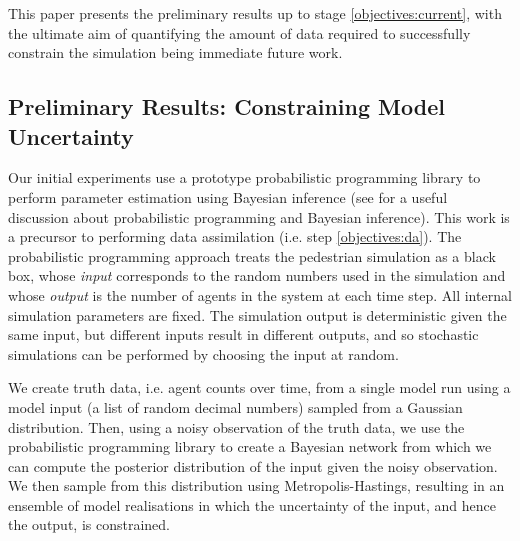 \documentclass[runningheads]{llncs}
\begin{document}
This paper presents the preliminary results up to stage \ref{objectives:current}, with the ultimate aim of quantifying the amount of data required to successfully constrain the simulation being immediate future work. 


\subsection{Preliminary Results: Constraining Model Uncertainty}

Our initial experiments use a prototype probabilistic programming library to perform parameter estimation using Bayesian inference (see \cite{ghahramani_probabilistic_2015} for a useful discussion about probabilistic programming and Bayesian inference). This work is a precursor to performing data assimilation (i.e. step \ref{objectives:da}). The probabilistic programming approach treats the pedestrian simulation as a black box, whose \emph{input} corresponds to the random numbers used in the simulation and whose \emph{output} is the number of agents in the system at each time step. All internal simulation parameters are fixed. The simulation output is deterministic given the same input, but different inputs result in different outputs, and so stochastic simulations can be performed by choosing the input at random.

We create truth data, i.e. agent counts over time, from a single model run using a model input (a list of random decimal numbers) sampled from a Gaussian distribution. Then, using a noisy observation of the truth data, we use the probabilistic programming library to create a Bayesian network from which we can compute the posterior distribution of the input given the noisy observation. We then sample from this distribution using Metropolis-Hastings, resulting in an ensemble of model realisations in which the uncertainty of the input, and hence the output, is constrained.

\end{document}
